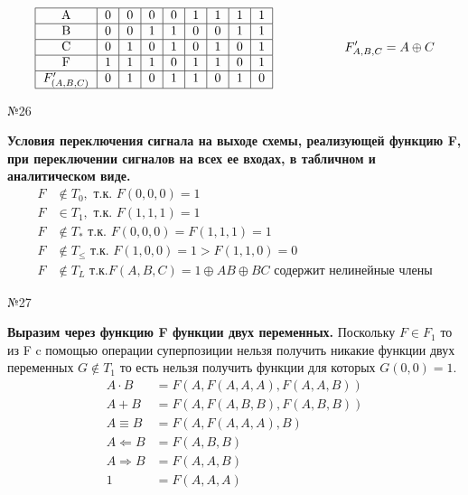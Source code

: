 \documentclass[]{article}
\begin{document}
	\[
	\begin{aligned}
	\begin{tabular}{|c|c|c|c|c|c|c|c|c|}
	\hline
	A              & 0 & 0 & 0 & 0 & 1 & 1 & 1 & 1 \\ \hline
	B              & 0 & 0 & 1 & 1 & 0 & 0 & 1 & 1 \\ \hline
	C              & 0 & 1 & 0 & 1 & 0 & 1 & 0 & 1 \\ \hline
	F              & 1 & 1 & 1 & 0 & 1 & 1 & 0 & 1 \\ \hline
	$F'_{(A,B,C)}$ & 0 & 1 & 0 & 1 & 1 & 0 & 1 & 0 \\ \hline
	\end{tabular}
	\begin{aligned}
	\hspace{2cm}
	F'_{A,B,C}&=A\oplus C\\
	\end{aligned}
	\end{aligned}
	\]
	\begin{center}\begin{large}{№26}\end{large}\end{center}
	\textbf{Условия переключения сигнала на выходе схемы, реализующей функцию F, при переключении сигналов на всех ее входах, в табличном и аналитическом виде.}
	\[
	\begin{aligned}
	F&\notin T_0,\text{ т.к. } F(0,0,0)=1\\
	F&\in T_1,\text{ т.к. } F(1,1,1)=1\\
	F&\notin T_*\text{ т.к. } F(0,0,0)=F(1,1,1)=1\\
	F&\notin T_{\le} \text{ т.к. } F(1,0,0)=1>F(1,1,0)=0\\
	F&\notin T_{L} \text{ т.к.} F(A,B,C)=1\oplus AB\oplus BC \text{ содержит нелинейные члены}
	\end{aligned}
	\]
	\begin{center}\begin{large}{№27}\end{large}\end{center}
	\textbf{Выразим через функцию F функции двух переменных.}
	Поскольку $F\in F_1$ то из F c помощью операции суперпозиции нельзя получить никакие функции двух переменных $G\notin T_1$ то есть нельзя получить функции для которых $G(0,0)=1$.
	\[
	\begin{aligned}
	A\cdot B &= F(A,F(A,A,A),F(A,A,B))\\
	A+B&=F(A,F(A,B,B),F(A,B,B))\\
	A\equiv B &=F(A,F(A,A,A),B)\\
	A\Leftarrow B &= F(A,B,B)\\
	A\Rightarrow B&=F(A,A,B)\\
	1&=F(A,A,A)
	\end{aligned}
	\]
\end{document}
